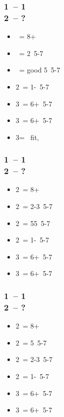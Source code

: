 \documentclass[12pt, a4paper]{article}
\begin{document}
\subsubsection*{1\hearts\ -- 1\spades\ \\ 2\clubs\ -- ?}
\begin{itemize}
    \item \diams\ = 8+
    \item \hearts\ = 2\hearts\ 5-7
    \item \spades\ = good 5\spades\ 5-7
    \item 2\ntx\ = 1-\hearts\ 5-7
    \item 3\clubs\ = 6+\clubs\ 5-7
    \item 3\diams\ = 6+\diams\ 5-7
    \item 3\hearts = \hearts\ fit, \gf
\end{itemize}

\subsubsection*{1\hearts\ -- 1\ntx\ \\ 2\clubs\ -- ?}
\begin{itemize}
    \item 2\diams\ = 8+
    \item 2\hearts\ = 2-3\hearts\ 5-7
    \item 2\spades\ = 55\minor\ 5-7
    \item 2\nt\ = 1-\hearts\ 5-7
    \item 3\clubs\ = 6+\clubs\ 5-7
    \item 3\diams\ = 6+\diams\ 5-7
\end{itemize}

\subsubsection*{1\spades\ -- 1\ntx\ \\ 2\clubs\ -- ?}
\begin{itemize}
    \item 2\diams\ = 8+
    \item 2\hearts\ = 5\hearts\ 5-7
    \item 2\spades\ = 2-3\spades\ 5-7
    \item 2\ntx\ = 1-\spades\ 5-7
    \item 3\clubs\ = 6+\clubs\ 5-7
    \item 3\diams\ = 6+\diams\ 5-7
\end{itemize}
\end{document}
